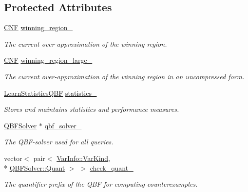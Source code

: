 \subsection*{Protected Attributes}
\begin{DoxyCompactItemize}
\item 
\hyperlink{classCNF}{C\-N\-F} \hyperlink{classLearnSynthQBFInd_ab8ce6031137413e90e0626bbdc734be0}{winning\-\_\-region\-\_\-}
\begin{DoxyCompactList}\small\item\em The current over-\/approximation of the winning region. \end{DoxyCompactList}\item 
\hyperlink{classCNF}{C\-N\-F} \hyperlink{classLearnSynthQBFInd_a333c9336ba28a2c41f252a3051a59581}{winning\-\_\-region\-\_\-large\-\_\-}
\begin{DoxyCompactList}\small\item\em The current over-\/approximation of the winning region in an uncompressed form. \end{DoxyCompactList}\item 
\hyperlink{classLearnStatisticsQBF}{Learn\-Statistics\-Q\-B\-F} \hyperlink{classLearnSynthQBFInd_af83f4253aeedaed56cb789369b054724}{statistics\-\_\-}
\begin{DoxyCompactList}\small\item\em Stores and maintains statistics and performance measures. \end{DoxyCompactList}\item 
\hyperlink{classQBFSolver}{Q\-B\-F\-Solver} $\ast$ \hyperlink{classLearnSynthQBFInd_ada2a2526b313b2ba4bb9d717fb63362d}{qbf\-\_\-solver\-\_\-}
\begin{DoxyCompactList}\small\item\em The Q\-B\-F-\/solver used for all queries. \end{DoxyCompactList}\item 
vector$<$ pair$<$ \hyperlink{classVarInfo_a64d1da76cf84fe674e5fef9764ef11cf}{Var\-Info\-::\-Var\-Kind}, \\*
\hyperlink{classQBFSolver_ac091e263cb55286cc07b2451bcf4d3c7}{Q\-B\-F\-Solver\-::\-Quant} $>$ $>$ \hyperlink{classLearnSynthQBFInd_ab9287e0b57dbf85dab6e7f7caf30cd13}{check\-\_\-quant\-\_\-}
\begin{DoxyCompactList}\small\item\em The quantifier prefix of the Q\-B\-F for computing counterexamples. \end{DoxyCompactList}\item 

\end{DoxyCompactItemize}

